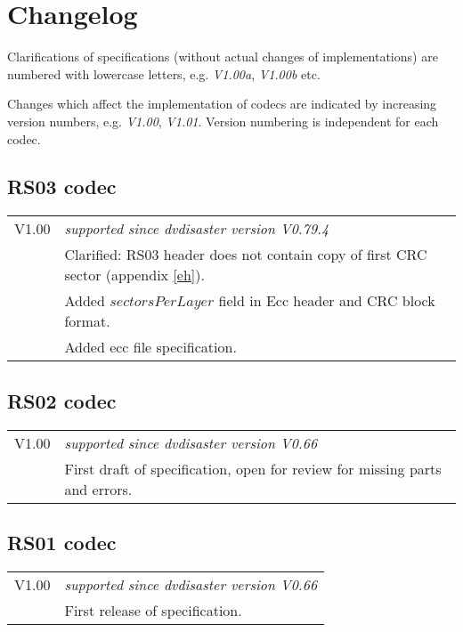 \section{Changelog}

Clarifications of specifications (without actual changes of implementations) 
are numbered with lowercase letters, e.g. {\em V1.00a}, {\em V1.00b} etc.

\smallskip

Changes which affect the implementation of codecs are indicated by increasing
version numbers, e.g. {\em V1.00}, {\em V1.01}. Version numbering is independent
for each codec.

\subsection{RS03 codec}

\begin{tabular}{lp{14cm}}
V1.00 & {\em supported since dvdisaster version V0.79.4} \\
      & Clarified: RS03 header does not contain copy of first CRC sector (appendix \ref{eh}). \\
      & Added $sectorsPerLayer$ field in Ecc header and CRC block format.\\
      & Added ecc file specification.\\
\end{tabular}

\subsection{RS02 codec}

\begin{tabular}{lp{14cm}}
V1.00 & {\em supported since dvdisaster version V0.66} \\
      & First draft of specification, open for review for missing parts and errors. \\
\end{tabular}

\subsection{RS01 codec}

\begin{tabular}{lp{14cm}}
V1.00 & {\em supported since dvdisaster version V0.66} \\
      & First release of specification. \\
\end{tabular}

\newpage
